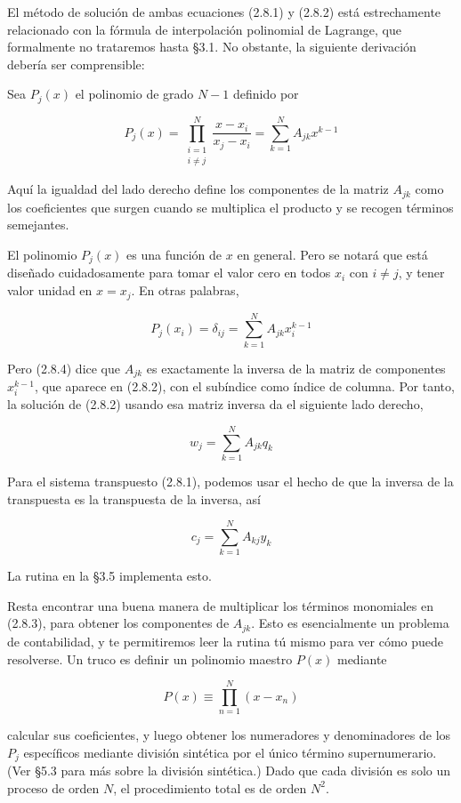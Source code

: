 \documentclass[10pt,a4paper]{book}
\begin{document}
El método de solución de ambas ecuaciones (2.8.1) y (2.8.2) está estrechamente relacionado con la fórmula de interpolación polinomial de Lagrange, que formalmente no trataremos hasta §3.1. No obstante, la siguiente derivación debería ser comprensible:

Sea \(P_j(x)\) el polinomio de grado \(N-1\) definido por

\[
P_j(x) = \prod_{\substack{i=1 \\ i \ne j}}^N \frac{x - x_i}{x_j - x_i} = \sum_{k=1}^N A_{jk} x^{k-1}
\tag{2.8.3}
\]

Aquí la igualdad del lado derecho define los componentes de la matriz \(A_{jk}\) como los coeficientes que surgen cuando se multiplica el producto y se recogen términos semejantes.

El polinomio \(P_j(x)\) es una función de \(x\) en general. Pero se notará que está diseñado cuidadosamente para tomar el valor cero en todos \(x_i\) con \(i \ne j\), y tener valor unidad en \(x = x_j\). En otras palabras,

\[
P_j(x_i) = \delta_{ij} = \sum_{k=1}^N A_{jk} x_i^{k-1}
\tag{2.8.4}
\]

Pero (2.8.4) dice que \(A_{jk}\) es exactamente la inversa de la matriz de componentes \(x_i^{k-1}\), que aparece en (2.8.2), con el subíndice como índice de columna. Por tanto, la solución de (2.8.2) usando esa matriz inversa da el siguiente lado derecho,

\[
w_j = \sum_{k=1}^N A_{jk} q_k
\tag{2.8.5}
\]

Para el sistema transpuesto (2.8.1), podemos usar el hecho de que la inversa de la transpuesta es la transpuesta de la inversa, así

\[
c_j = \sum_{k=1}^N A_{kj} y_k
\tag{2.8.6}
\]

La rutina en la §3.5 implementa esto.

Resta encontrar una buena manera de multiplicar los términos monomiales en (2.8.3), para obtener los componentes de \(A_{jk}\). Esto es esencialmente un problema de contabilidad, y te permitiremos leer la rutina tú mismo para ver cómo puede resolverse. Un truco es definir un polinomio maestro \(P(x)\) mediante

\[
P(x) \equiv \prod_{n=1}^{N} (x - x_n)
\tag{2.8.7}
\]

calcular sus coeficientes, y luego obtener los numeradores y denominadores de los \(P_j\) específicos mediante división sintética por el único término supernumerario. (Ver §5.3 para más sobre la división sintética.) Dado que cada división es solo un proceso de orden \(N\), el procedimiento total es de orden \(N^2\).
\end{document}
